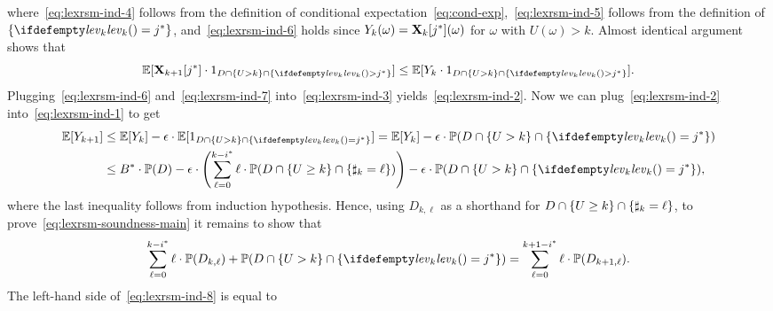where~\eqref{eq:lexrsm-ind-4} follows from the definition of conditional expectation~\eqref{eq:cond-exp},~\eqref{eq:lexrsm-ind-5} follows from the definition of $\{\levelrank{}{k}=\fixn{j}\}$, and~\eqref{eq:lexrsm-ind-6} holds since $Y_k(\omega)=\mathbf{X}_{k}[{j}^*](\omega)$ for $\omega$ with $U(\omega)> k$. Almost identical argument shows that
\begin{equation}
\label{eq:lexrsm-ind-7}
\E[\vecseq{X}{k+1}{\fixn{j}}\cdot \indicator{D\cap \{U > k \} \cap \{\levelrank{}{k}>\fixn{j} \} }] \leq \E[Y_k\cdot \indicator{D\cap \{U > k \} \cap \{\levelrank{}{k}>\fixn{j} \}}].
\end{equation}
Plugging~\eqref{eq:lexrsm-ind-6} and~\eqref{eq:lexrsm-ind-7} into~\eqref{eq:lexrsm-ind-3} yields~\eqref{eq:lexrsm-ind-2}. Now we can plug~\eqref{eq:lexrsm-ind-2} into~\eqref{eq:lexrsm-ind-1} to get
\begin{align}
\E[Y_{k+1}]&\leq \E[Y_k] - \eps\cdot \E[\indicator{D \cap \{U>k\} \cap \{\levelrank{}{k} = \fixn{j} \} }] = \E[Y_k] - \eps\cdot \probm(D \cap \{U>k\} \cap \{\levelrank{}{k} = \fixn{j} \} ) \nonumber\\
&\leq \fixn{B}\cdot \probm(D) - \eps\cdot\left(\sum_{\ell=0}^{k-\fixn{i}} \ell\cdot\probm(D 
\cap \{U\geq k\} \cap \{\noofdec_k = \ell\})\right) -\eps\cdot \probm(D \cap \{U>k\} \cap \{\levelrank{}{k} = \fixn{j} \}),
\end{align}
where the last inequality follows from induction hypothesis. Hence, using $D_{k,\ell}$ as a shorthand for $D 
\cap \{U\geq k\} \cap \{\sharp_k = \ell\}$, to prove~\eqref{eq:lexrsm-soundness-main} it remains to show that
\begin{equation}
\label{eq:lexrsm-ind-8}
\sum_{\ell=0}^{k-\fixn{i}} \ell\cdot\probm(D_{k,\ell}) + \probm(D \cap \{U>k\} \cap \{\levelrank{}{k} = \fixn{j} \}) = \sum_{\ell=0}^{k+1-\fixn{i}} \ell\cdot\probm(D_{k+1,\ell}).
\end{equation}
The left-hand side of~\eqref{eq:lexrsm-ind-8} is equal to

